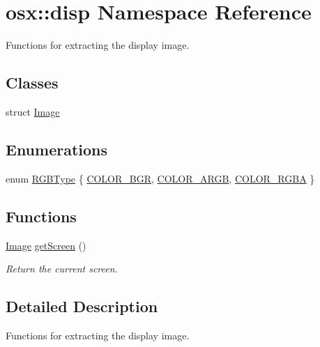 \hypertarget{namespaceosx_1_1disp}{\section{osx\-:\-:disp Namespace Reference}
\label{namespaceosx_1_1disp}
}


Functions for extracting the display image.  


\subsection*{Classes}
\begin{DoxyCompactItemize}
\item 
struct \hyperlink{structosx_1_1disp_1_1_image}{Image}
\end{DoxyCompactItemize}
\subsection*{Enumerations}
\begin{DoxyCompactItemize}
\item 
enum \hyperlink{namespaceosx_1_1disp_a63adf9b0b0b0365ec428dd44fc30c659}{R\-G\-B\-Type} \{ \hyperlink{namespaceosx_1_1disp_a63adf9b0b0b0365ec428dd44fc30c659ab96ecb2ad3c69bf9019d7ed4253603b1}{C\-O\-L\-O\-R\-\_\-\-B\-G\-R}, 
\hyperlink{namespaceosx_1_1disp_a63adf9b0b0b0365ec428dd44fc30c659a307b3e319b6708774c7672d7efc04d0d}{C\-O\-L\-O\-R\-\_\-\-A\-R\-G\-B}, 
\hyperlink{namespaceosx_1_1disp_a63adf9b0b0b0365ec428dd44fc30c659aefca227dbfbf6803b1248aceeaa187b7}{C\-O\-L\-O\-R\-\_\-\-R\-G\-B\-A}
 \}
\end{DoxyCompactItemize}
\subsection*{Functions}
\begin{DoxyCompactItemize}
\item 
\hyperlink{structosx_1_1disp_1_1_image}{Image} \hyperlink{namespaceosx_1_1disp_a8e0f791a8c9413d16403b6b793864cb7}{get\-Screen} ()
\begin{DoxyCompactList}\small\item\em Return the current screen. \end{DoxyCompactList}\end{DoxyCompactItemize}


\subsection{Detailed Description}
Functions for extracting the display image. 

